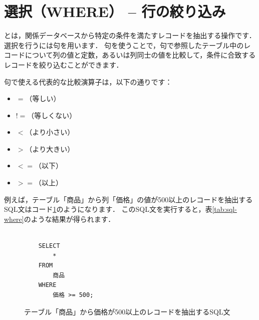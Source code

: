 \section{選択（WHERE） -- 行の絞り込み}
とは，関係データベースから特定の条件を満たすレコードを抽出する操作です．
選択を行うには句を用います．
句を使うことで，句で参照したテーブル中のレコードについて列の値と定数，あるいは列同士の値を比較して，条件に合致するレコードを絞り込むことができます．

句で使える代表的な比較演算子は，以下の通りです：
\begin{itemize}
\item $=$（等しい）
\item $!=$（等しくない）
\item $<$（より小さい）
\item $>$（より大きい）
\item $<=$（以下）
\item $>=$（以上）
\end{itemize}
例えば，テーブル「商品」から列「価格」の値が500以上のレコードを抽出するSQL文はコード\ref{code:sql-where}のようになります．
このSQL文を実行すると，表\ref{tab:sql-where}のような結果が得られます．
\begin{figure}[!htbp]
    \begin{verbatim}

    SELECT
        *
    FROM
        商品
    WHERE
        価格 >= 500;

    \end{verbatim}
    \captionsetup{name=コード}
    \caption{テーブル「商品」から価格が500以上のレコードを抽出するSQL文}
    \label{code:sql-where}
\end{figure}
\begin{table}[!htbp]
    \centering
    \caption{テーブル「商品」から価格が500以上のレコードを抽出した結果}
    \label{tab:sql-where}
\end{table}

